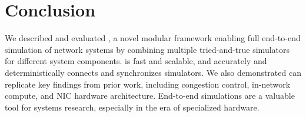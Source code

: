 \section{Conclusion}

We described and evaluated \sysname, a novel modular framework
enabling full end-to-end simulation of network systems by combining
multiple tried-and-true simulators for different system components.
%
\sysname is fast and scalable, and accurately and deterministically
connects and synchronizes simulators.
%
We also demonstrated \sysname can replicate key findings from prior
work, including congestion control, in-network compute, and NIC
hardware architecture.
%
End-to-end simulations are a valuable tool for systems research,
especially in the era of specialized hardware.

